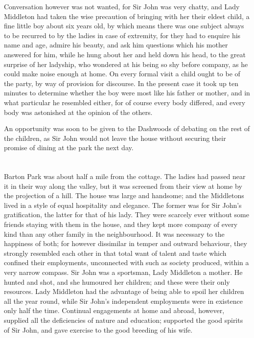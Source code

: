Conversation however was not wanted, for Sir John was very chatty, and Lady Middleton had taken the wise precaution of bringing with her their eldest child, a fine little boy about six years old, by which means there was one subject always to be recurred to by the ladies in case of extremity, for they had to enquire his name and age, admire his beauty, and ask him questions which his mother answered for him, while he hung about her and held down his head, to the great surprise of her ladyship, who wondered at his being so shy before company, as he could make noise enough at home. On every formal visit a child ought to be of the party, by way of provision for discourse. In the present case it took up ten minutes to determine whether the boy were most like his father or mother, and in what particular he resembled either, for of course every body differed, and every body was astonished at the opinion of the others.

An opportunity was soon to be given to the Dashwoods of debating on the rest of the children, as Sir John would not leave the house without securing their promise of dining at the park the next day.

\chapter{} %

Barton Park was about half a mile from the cottage. The ladies had passed near it in their way along the valley, but it was screened from their view at home by the projection of a hill. The house was large and handsome; and the Middletons lived in a style of equal hospitality and elegance. The former was for Sir John's gratification, the latter for that of his lady. They were scarcely ever without some friends staying with them in the house, and they kept more company of every kind than any other family in the neighbourhood. It was necessary to the happiness of both; for however dissimilar in temper and outward behaviour, they strongly resembled each other in that total want of talent and taste which confined their employments, unconnected with such as society produced, within a very narrow compass. Sir John was a sportsman, Lady Middleton a mother. He hunted and shot, and she humoured her children; and these were their only resources. Lady Middleton had the advantage of being able to spoil her children all the year round, while Sir John's independent employments were in existence only half the time. Continual engagements at home and abroad, however, supplied all the deficiencies of nature and education; supported the good spirits of Sir John, and gave exercise to the good breeding of his wife.

